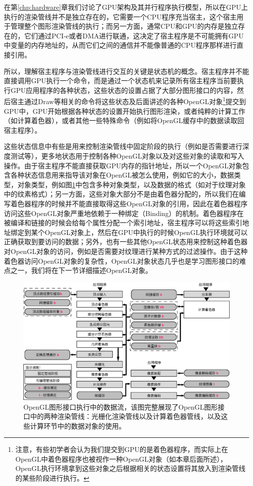 在第\ref{chp:hardware}章我们讨论了GPU架构及其并行程序执行模型，所以在GPU上执行的渲染管线并不是独立存在的，它需要一个CPU程序充当宿主，这个宿主用于管理整个图形渲染管线的执行；而另一方面，通常CPU和GPU的内存是独立存在的，它们通过PCI-e或者DMA进行联通，这决定了宿主程序是不可能拥有GPU中变量的内存地址的，从而它们之间的通信并不能像普通的CPU程序那样进行直接引用。

所以，理解宿主程序与渲染管线进行交互的关键是状态机的概念。宿主程序并不能直接调用GPU执行一个命令，而是通过一个状态机来记录所有宿主程序当前要执行GPU应用程序的各种状态，这些状态的设置占据了大部分图形接口的内容，然后宿主通过Draw等相关的命令将这些状态及后面讲述的各种OpenGL对象\footnote{注意，有些初学者会认为我们提交到GPU的是着色器程序，而实际上在OpenGL中着色器程序也被视作一种OpenGL对象（如本章后面所述），OpenGL执行环境拿到这些对象之后根据相关的状态设置将其放入到渲染管线的某些阶段进行执行。}提交到GPU中，GPU开始根据各种状态的设置开始执行图形渲染，或者纯粹的计算工作（如计算着色器），或者其他一些特殊命令（例如将OpenGL缓存中的数据读取回宿主程序）。

这些状态信息中有些是用来控制渲染管线中固定阶段的执行（例如是否需要进行深度测试等），更多地状态用于控制各种OpenGL对象以及对这些对象的读取和写入操作。由于宿主程序不能直接获取GPU内存的指针地址，所以一个OpenGL对象包含各种状态信息用来指导该对象在OpenGL被怎么使用，例如它的大小，数据类型，对象类型，例如图\ref{f:api-pipeline}中包含多种对象类型，以及数据的格式（如对于纹理对象中的纹素格式）；另一方面，这些对象大部分不是由着色器分配的，所以我们在编写着色器程序的时候并不能直接取得这些OpenGL对象的引用，因此在着色器程序访问这些OpenGL对象严重地依赖于一种绑定（Binding）的机制。着色器程序在被编译和链接的时候会给每个属性分配一个索引地址，宿主程序可以将这些索引地址绑定到某个OpenGL对象上，然后在GPU中执行的时候OpenGL执行环境就可以正确获取到要访问的数据；另外，也有一些其他OpenGL状态用来控制这种着色器对OpenGL对象的访问，例如是否需要对纹理进行某种方式的过滤操作。由于这种着色器访问OpenGL对象的复杂性，OpenGL对象状态几乎也是学习图形接口的难点之一，我们将在下一节详细描述OpenGL对象。

\begin{figure}
\begin{fullwidth}
	\includegraphics[width=\thewidth]{figures/api/pipeline}
	\caption{OpenGL图形接口执行中的数据流，该图完整展现了OpenGL图形接口中的两种渲染管线：光栅化渲染管线以及计算着色器管线，以及这些计算环节中的数据对象的使用。}
	\label{f:api-pipeline}
\end{fullwidth}
\end{figure}

